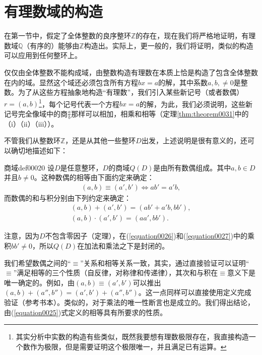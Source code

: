 \section{有理数域的构造}\label{subsection00202}
在第一节中，假定了全体整数的良序整环$\mathbb{Z}$的存在，现在我们将严格地证明，有理数域$\mathbb{Q}$（有序的）能够由$\mathbb{Z}$构造出。实际上，更一般的，我们将证明，类似的构造可以应用到任何整环上。

仅仅由全体整数不能构成域，由整数构造有理数在本质上恰是构造了包含全体整数在内的域。显然这个域还必须包含所有方程$bx=a$的解，其中系数$a,b,\neq 0$是整数。为了从这些方程抽象地构造“有理数”，我们引入某些新记号（或者数偶）$r=(a,b)$\footnote{其实分析中实数的构造有些类似，既然我要想有理数极限存在，我直接构造一个数作为极限，但是需要证明这个极限唯一，并且满足已有运算。}，每个记号代表一个方程$bx=a$的解，为此，我们必须说明，这些新记号完全像域中的商$\frac{a}{b}$那样可以相加，相乘和相等（定理\ref{thm:theorem0031}中的（i）（ii）（iii））。

不管我们从整数环$\mathbb{Z}$，还是从其他一些整环$D$出发，上述说明是很有意义的，还可以确切地描述如下：
\begin{definition}{商域}{def00020}
设$D$是任意整环，$D$的商域$Q(D)$是由所有数偶组成。其中$a, b \in D$并且$b \neq 0$。这种数偶的相等由下面约定来确定：
\begin{gather}\label{equation0025}
(a,b) \equiv (a',b') \Leftrightarrow ab'=a'b,
\end{gather}
而数偶的和与积分别由下列约定来确定：
\begin{gather}
(a,b) + (a', b') = (ab'+a'b, bb'),\label{equation0026}\\
(a, b) \cdot (a', b') = (aa', bb').\label{equation0027}
\end{gather}
\end{definition}

注意，因为$D$不包含零因子（定理），在(\ref{equation0026})和(\ref{equation0027})中的乘积$bb' \neq 0$，所以$Q(D)$在加法和乘法之下是封闭的。

我们希望数偶之间的“$\equiv$”关系和相等关系一致，其实，通过直接验证可以证明“$\equiv$”满足相等的三个性质（自反律，对称律和传递律），其次和与积在$\equiv$意义下是唯一确定的。例如，由$(a,b) \equiv (a', b')$可以推出$(a, b)+(a'', b'')=(a',b')+(a'', b'')$。这一点同样可以直接使用定义完成验证（参考书本）。类似的，对于乘法的唯一性断言也是成立的。我们得出结论，由(\ref{equation0025})式定义的相等具有所要求的性质。

